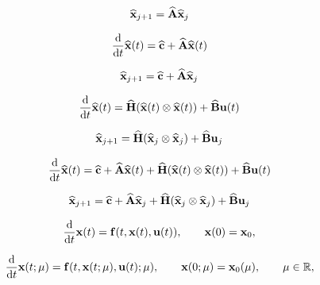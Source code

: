 \documentclass[12 pt]{article}
\begin{document}
\begin{align*}
    \xrom_{j+1}
    = \Arom\xrom_{j}
\end{align*}

\begin{align*}
    \ddt\xrom(t)
    = \crom + \Arom\xrom(t)
\end{align*}

\begin{align*}
    \xrom_{j+1}
    = \crom + \Arom\xrom_{j}
\end{align*}

\begin{align*}
    \ddt\xrom(t)
    = \Hrom(\xrom(t) \otimes \xrom(t)) + \Brom\ufom(t)
\end{align*}

\begin{align*}
    \xrom_{j+1}
    = \Hrom(\xrom_{j} \otimes \xrom_{j}) + \Brom\ufom_{j}
\end{align*}

\begin{align*}
    \ddt\xrom(t)
    = \crom + \Arom\xrom(t) + \Hrom(\xrom(t) \otimes \xrom(t)) + \Brom\ufom(t)
\end{align*}

\begin{align*}
    \xrom_{j+1}
    = \crom + \Arom\xrom_{j} + \Hrom(\xrom_{j} \otimes \xrom_{j}) + \Brom\ufom_{j}
\end{align*}


\begin{align*}
    \ddt\xfom(t)
    = \ffom(t,\xfom(t),\ufom(t)),
    \qquad
    \xfom(0)
    = \xfom_0,
\end{align*}

\begin{align*}
    \ddt\xfom(t;\sparam)
    = \ffom(t,\xfom(t;\sparam),\ufom(t);\sparam),
    \qquad
    \xfom(0;\sparam)
    = \xfom_0(\sparam),
    \qquad
    \sparam\in\RR,
\end{align*}
\end{document}
